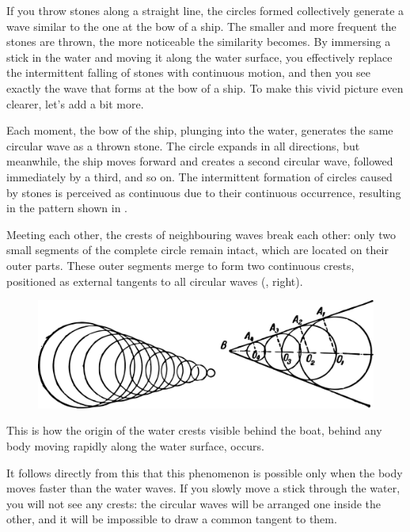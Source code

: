 If you throw stones along a straight line, the circles formed collectively generate a wave similar to the one at the bow of a ship. The smaller and more frequent the stones are thrown, the more noticeable the similarity becomes. By immersing a stick in the water and moving it along the water surface, you effectively replace the intermittent falling of stones with continuous motion, and then you see exactly the wave that forms at the bow of a ship. To make this vivid picture even clearer, let's add a bit more. 

Each moment, the bow of the ship, plunging into the water, generates the same circular wave as a thrown stone. The circle expands in all directions, but meanwhile, the ship moves forward and creates a second circular wave, followed immediately by a third, and so on. The intermittent formation of circles caused by stones is perceived as continuous due to their continuous occurrence, resulting in the pattern shown in .

Meeting each other, the crests of neighbouring waves break each other: only two small segments of the complete circle remain intact, which are located on their outer parts. These outer segments merge to form two continuous crests, positioned as external tangents to all circular waves (, right).


\begin{figure}[h!]
\centering
\includegraphics[width=\textwidth]{figures/ch-02/fig-049.pdf}
\end{figure}

This is how the origin of the water crests visible behind the boat, behind any body moving rapidly along the water surface, occurs.

It follows directly from this that this phenomenon is possible only when the body moves faster than the water waves. If you slowly move a stick through the water, you will not see any crests: the circular waves will be arranged one inside the other, and it will be impossible to draw a common tangent to them.

